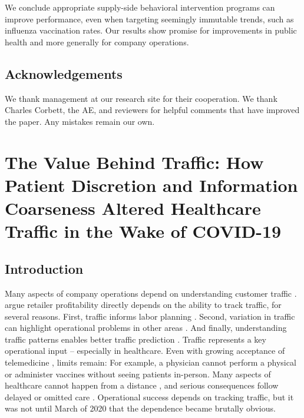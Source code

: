 \begin{onehalfspace}
 We conclude appropriate supply-side behavioral intervention programs can improve performance, even when targeting seemingly immutable trends, such as influenza vaccination rates. Our results show promise for improvements in public health and more generally for company operations.
 

\end{onehalfspace}

\section*{Acknowledgements}
We thank management at our research site for their cooperation. We thank Charles Corbett, the AE, and reviewers for helpful comments that have improved the paper. Any mistakes remain our own.  









\chapter{The Value Behind Traffic: How Patient Discretion and Information Coarseness Altered Healthcare Traffic in the Wake of COVID-19}

\section{Introduction}
 Many aspects of company operations depend on understanding customer traffic \citep{Gallino2014}. \cite{Perdikaki2012} argue retailer profitability directly depends on the ability to track traffic, for several reasons. First, traffic informs labor planning \citep{Mani2015,Chuang2015,Perdikaki2017,Netessine2010}. Second, variation in traffic can highlight operational problems in other areas \citep{Lee2017}. And finally, understanding traffic patterns enables better traffic prediction \citep{Yung2020,Kamalahmadi2021,Abrishami2018}. Traffic represents a key operational input -- especially in healthcare. Even with growing acceptance of telemedicine \citep{WSJ_21_telemed,Friedman2021}, limits remain: For example, a physician cannot perform a physical or administer vaccines without seeing patients in-person. Many aspects of healthcare cannot happen from a distance \citep{Romanick-Schmiedl2020}, and serious consequences follow delayed or omitted care \citep{Findling2020,CDC_ExcessDeath}. Operational success depends on tracking traffic, but it was not until March of 2020 that the dependence became brutally obvious.
 
